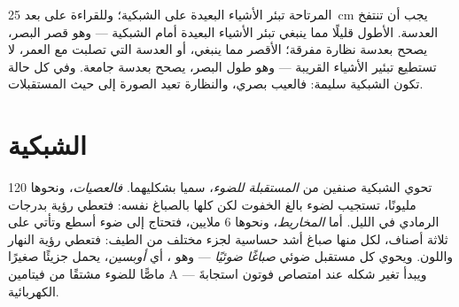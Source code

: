 \begin{example}\label{ex:g11:the-eye:focus}
 المرتاحة تبئر الأشياء البعيدة على الشبكية؛ وللقراءة على بعد
\qty{25}{cm} يجب أن تنتفخ العدسة.  الأطول قليلًا مما ينبغي تبئر
الأشياء البعيدة أمام الشبكية --- وهو قصر البصر، يصحح بعدسة نظارة
مفرقة؛  الأقصر مما ينبغي، أو العدسة التي تصلبت مع العمر، لا
تستطيع تبئير الأشياء القريبة --- وهو طول البصر، يصحح بعدسة جامعة. وفي
كل حالة تكون الشبكية سليمة: فالعيب بصري، والنظارة تعيد الصورة إلى حيث
المستقبلات.
\end{example}

\section{الشبكية}

\begin{definition}\label{def:g11:the-eye:photoreceptors}
تحوي الشبكية صنفين من  \emph{المستقبلة للضوء}،
سميا بشكليهما. \emph{فالعصيات}، ونحوها 120
مليونًا، تستجيب لضوء بالغ الخفوت لكن كلها بالصباغ نفسه: فتعطي رؤية
بدرجات الرمادي في الليل. أما \emph{المخاريط}،
ونحوها 6 ملايين، فتحتاج إلى ضوء أسطع وتأتي على ثلاثة أصناف، لكل منها
صباغ أشد حساسية لجزء مختلف من الطيف: فتعطي رؤية النهار واللون. ويحوي
كل مستقبل ضوئي \emph{صباغًا ضوئيًا} --- وهو ، أي
\emph{أوبسين}، يحمل جزيئًا صغيرًا ماصًّا للضوء مشتقًا من
فيتامين A --- ويبدأ تغير شكله عند امتصاص فوتون استجابةَ 
الكهربائية.
\end{definition}

